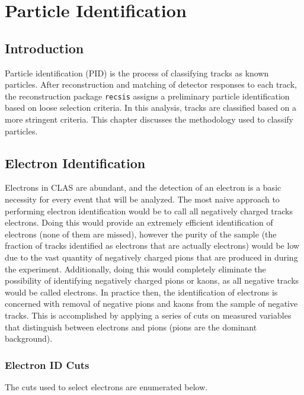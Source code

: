 \chapter{Particle Identification}

\section{Introduction}
Particle identification (PID) is the process of classifying tracks as known particles.  After reconstruction and matching of detector responses to each track, the reconstruction package \texttt{recsis} assigns a preliminary particle identification based on loose selection criteria.  In this analysis, tracks are classified based on a more stringent criteria.  This chapter discusses the methodology used to classify particles.  

\section{Electron Identification}
Electrons in CLAS are abundant, and the detection of an electron is a basic necessity for every event that will be analyzed.  The most naive approach to performing electron identification would be to call all negatively charged tracks electrons.  Doing this would provide an extremely efficient identification of electrons (none of them are missed), however the purity of the sample (the fraction of tracks identified as electrons that are actually electrons) would be low due to the vast quantity of negatively charged pions that are produced in during the experiment.  Additionally, doing this would completely eliminate the possibility of identifying negatively charged pions or kaons, as all negative tracks would be called electrons.  In practice then, the identification of electrons is concerned with removal of negative pions and kaons from the sample of negative tracks.  This is accomplished by applying a series of cuts on measured variables that distinguish between electrons and pions (pions are the dominant background).

\subsection{Electron ID Cuts}
The cuts used to select electrons are enumerated below.

